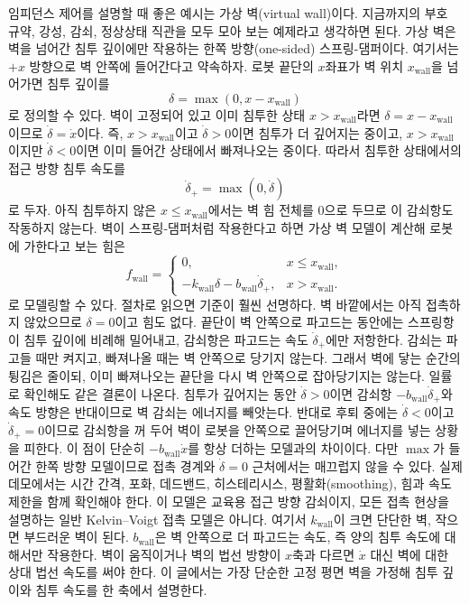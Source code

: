 임피던스 제어를 설명할 때 좋은 예시는 가상 벽(virtual wall)이다.
지금까지의 부호 규약, 강성, 감쇠, 정상상태 직관을 모두 모아 보는 예제라고 생각하면 된다.
가상 벽은 벽을 넘어간 침투 깊이에만 작용하는 한쪽 방향(one-sided) 스프링-댐퍼이다.
여기서는 $+x$ 방향으로 벽 안쪽에 들어간다고 약속하자.
로봇 끝단의 $x$좌표가 벽 위치 $x_{\mathrm{wall}}$을 넘어가면 침투 깊이를
\begin{equation}
  \delta = \max(0, x - x_{\mathrm{wall}})
  \label{eq:virtual-wall-penetration}
\end{equation}
로 정의할 수 있다.
벽이 고정되어 있고 이미 침투한 상태 $x>x_{\mathrm{wall}}$라면 $\delta=x-x_{\mathrm{wall}}$이므로 $\dot{\delta}=\dot{x}$이다.
즉, $x>x_{\mathrm{wall}}$이고 $\dot{\delta}>0$이면 침투가 더 깊어지는 중이고, $x>x_{\mathrm{wall}}$이지만 $\dot{\delta}<0$이면 이미 들어간 상태에서 빠져나오는 중이다.
따라서 침투한 상태에서의 접근 방향 침투 속도를
\begin{equation}
  \dot{\delta}_+ = \max(0,\dot{\delta})
  \label{eq:virtual-wall-approach-speed}
\end{equation}
로 두자.
아직 침투하지 않은 $x\le x_{\mathrm{wall}}$에서는 벽 힘 전체를 0으로 두므로 이 감쇠항도 작동하지 않는다.
벽이 스프링-댐퍼처럼 작용한다고 하면 가상 벽 모델이 계산해 로봇에 가한다고 보는 힘은
\begin{equation}
  f_{\mathrm{wall}}
  =
  \begin{cases}
    0, & x \le x_{\mathrm{wall}}, \\
    -k_{\mathrm{wall}}\delta
    -
    b_{\mathrm{wall}}\dot{\delta}_+, & x > x_{\mathrm{wall}}.
  \end{cases}
  \label{eq:virtual-wall-force}
\end{equation}
로 모델링할 수 있다.
절차로 읽으면 기준이 훨씬 선명하다.
벽 바깥에서는 아직 접촉하지 않았으므로 $\delta=0$이고 힘도 없다.
끝단이 벽 안쪽으로 파고드는 동안에는 스프링항이 침투 깊이에 비례해 밀어내고, 감쇠항은 파고드는 속도 $\dot{\delta}_+$에만 저항한다.
감쇠는 파고들 때만 켜지고, 빠져나올 때는 벽 안쪽으로 당기지 않는다.
그래서 벽에 닿는 순간의 튕김은 줄이되, 이미 빠져나오는 끝단을 다시 벽 안쪽으로 잡아당기지는 않는다.
일률로 확인해도 같은 결론이 나온다.
침투가 깊어지는 동안 $\dot{\delta}>0$이면 감쇠항 $-b_{\mathrm{wall}}\dot{\delta}_+$와 속도 방향은 반대이므로 벽 감쇠는 에너지를 빼앗는다.
반대로 후퇴 중에는 $\dot{\delta}<0$이고 $\dot{\delta}_+=0$이므로 감쇠항을 꺼 두어 벽이 로봇을 안쪽으로 끌어당기며 에너지를 넣는 상황을 피한다.
이 점이 단순히 $-b_{\mathrm{wall}}\dot{x}$를 항상 더하는 모델과의 차이이다.
다만 $\max$가 들어간 한쪽 방향 모델이므로 접촉 경계와 $\dot{\delta}=0$ 근처에서는 매끄럽지 않을 수 있다.
실제 데모에서는 시간 간격, 포화, 데드밴드, 히스테리시스, 평활화(smoothing), 힘과 속도 제한을 함께 확인해야 한다.
이 모델은 교육용 접근 방향 감쇠이지, 모든 접촉 현상을 설명하는 일반 Kelvin--Voigt 접촉 모델은 아니다.
여기서 $k_{\mathrm{wall}}$이 크면 단단한 벽, 작으면 부드러운 벽이 된다.
$b_{\mathrm{wall}}$은 벽 안쪽으로 더 파고드는 속도, 즉 양의 침투 속도에 대해서만 작용한다.
벽이 움직이거나 벽의 법선 방향이 $x$축과 다르면 $\dot{x}$ 대신 벽에 대한 상대 법선 속도를 써야 한다.
이 글에서는 가장 단순한 고정 평면 벽을 가정해 침투 깊이와 침투 속도를 한 축에서 설명한다.

